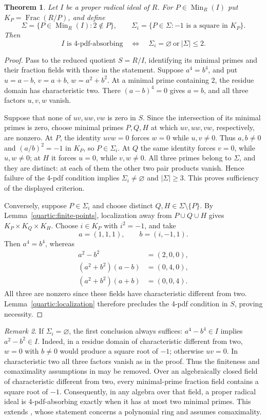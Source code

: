 \documentclass[11pt,a4paper]{amsart}
\newtheorem{theorem}{Theorem}[section]
\theoremstyle{definition}
\theoremstyle{remark}
\newtheorem{remark}[theorem]{Remark}
\DeclareMathOperator{\Min}{Min}
\DeclareMathOperator{\Frac}{Frac}
\numberwithin{equation}{section}
\begin{document}
\begin{theorem}\label{quartic:radical-criterion}
Let $I$ be a proper radical ideal of $R$. For $P\in\Min_R(I)$ put
$K_P=\Frac(R/P)$, and define
\[
 \Sigma=\{P\in\Min_R(I):2\notin P\},\qquad
 \Sigma_i=\{P\in\Sigma:-1\text{ is a square in }K_P\}.
\]
Then
\[
 I\text{ is 4-pdf-absorbing}
 \quad\Longleftrightarrow\quad
 \Sigma_i=\varnothing\ \text{or}\ |\Sigma|\le2.
\]
\end{theorem}
\begin{proof}
Pass to the reduced quotient $S=R/I$, identifying its minimal
primes and their fraction fields with those in the statement.
Suppose $a^4=b^4$, and put $u=a-b$, $v=a+b$, $w=a^2+b^2$.
At a minimal prime containing $2$, the residue domain has
characteristic two. There $(a-b)^4=0$ gives $a=b$, and all
three factors $u,v,w$ vanish.

Suppose that none of $uv,uw,vw$ is zero in $S$. Since the
intersection of its minimal primes is zero, choose minimal
primes $P,Q,H$ at which $uv,uw,vw$, respectively, are nonzero.
At $P$, the identity $uvw=0$ forces $w=0$ while $u,v\ne0$.
Thus $a,b\ne0$ and $(a/b)^2=-1$ in $K_P$, so $P\in\Sigma_i$.
At $Q$ the same identity forces $v=0$, while $u,w\ne0$;
at $H$ it forces $u=0$, while $v,w\ne0$.
All three primes belong to $\Sigma$, and they are distinct:
at each of them the other two pair products vanish.
Hence failure of the 4-pdf condition implies
$\Sigma_i\ne\varnothing$ and $|\Sigma|\ge3$. This proves
sufficiency of the displayed criterion.

Conversely, suppose $P\in\Sigma_i$ and choose distinct
$Q,H\in\Sigma\setminus\{P\}$. By
Lemma~\ref{quartic:finite-points}, localization away from
$P\cup Q\cup H$ gives $K_P\times K_Q\times K_H$.
Choose $i\in K_P$ with $i^2=-1$, and take
\[
 a=(1,1,1),\qquad b=(i,-1,1).
\]
Then $a^4=b^4$, whereas
\[
 \begin{aligned}
 a^2-b^2&=(2,0,0),\\
 (a^2+b^2)(a-b)&=(0,4,0),\\
 (a^2+b^2)(a+b)&=(0,0,4).
 \end{aligned}
\]
All three are nonzero since these fields have characteristic
different from two. Lemma~\ref{quartic:localization} therefore
precludes the 4-pdf condition in $S$, proving necessity.
\end{proof}

\begin{remark}\label{quartic:scope-of-extension}
If $\Sigma_i=\varnothing$, the first conclusion always suffices:
$a^4-b^4\in I$ implies $a^2-b^2\in I$. Indeed, in a residue
domain of characteristic different from two, $w=0$ with $b\ne0$
would produce a square root of $-1$; otherwise $uv=0$.
In characteristic two all three factors vanish as in the proof.
Thus the finiteness and comaximality assumptions in
\cite[Corollary~2.11]{TAHA} may be removed. Over an algebraically
closed field of characteristic different from two, every
minimal-prime fraction field contains a square root of $-1$.
Consequently, in any algebra over that field, a proper radical
ideal is 4-pdf-absorbing exactly when it has at most two minimal
primes. This extends \cite[Corollary~2.12]{TAHA}, whose statement
concerns a polynomial ring and assumes comaximality.
\end{remark}
\end{document}
